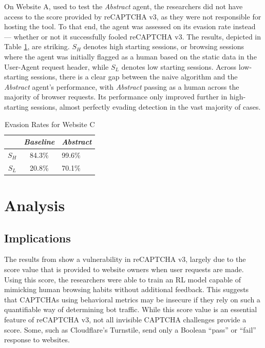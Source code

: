 \documentclass[sigplan,screen,nonacm]{acmart-tagged}
\begin{document}
On Website A, used to test the \textit{Abstract} agent, the researchers did not have access to the score provided by reCAPTCHA v3, as they were not responsible for hosting the tool. To that end, the agent was assessed on its evasion rate instead --- whether or not it successfully fooled reCAPTCHA v3. The results, depicted in Table \ref{tab:c}, are striking. $S_H$ denotes high starting sessions, or browsing sessions where the agent was initially flagged as a human based on the static data in the User-Agent request header, while $S_L$ denotes low starting sessions. Across low-starting sessions, there is a clear gap between the naive algorithm and the \textit{Abstract} agent's performance, with \textit{Abstract} passing as a human across the majority of browser requests. Its performance only improved further in high-starting sessions, almost perfectly evading detection in the vast majority of cases.

\begin{table}
  \begin{tabular}{ccl}
    \toprule
    &\textit{Baseline}&\textit{Abstract}\\
    \midrule
    $S_H$ & 84.3\% & 99.6\%\\
    $S_L$ & 20.8\% & 70.1\%\\
  \bottomrule
  \end{tabular}
  \caption{Evasion Rates for Website C \cite{tsingen}}
  \label{tab:c}
\end{table}

\section{Analysis}
\label{sec:analysis}

\subsection{Implications}
\label{sec:implications}

The results from \cite{tsingen} show a vulnerability in reCAPTCHA v3, largely due to the score value that is provided to website owners when user requests are made. Using this score, the researchers were able to train an RL model capable of mimicking human browsing habits without additional feedback. This suggests that CAPTCHAs using behavioral metrics may be insecure if they rely on such a quantifiable way of determining bot traffic. While this score value is an essential feature of reCAPTCHA v3, not all invisible CAPTCHA challenges provide a score. Some, such as Cloudflare's Turnstile, send only a Boolean ``pass'' or ``fail'' response to websites.
\end{document}
